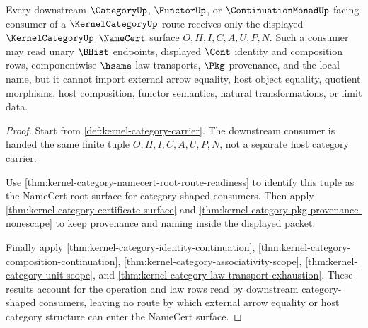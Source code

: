 \begin{theorem}
\label{thm:kernel-category-downstream-namecert-readiness}
Every downstream $\CategoryUp$, $\FunctorUp$, or $\ContinuationMonadUp$-facing consumer of a $\KernelCategoryUp$ route receives only the displayed $\KernelCategoryUp$ $\NameCert$ surface $O,H,I,C,A,U,P,N$. Such a consumer may read unary $\BHist$ endpoints, displayed $\Cont$ identity and composition rows, componentwise $\hsame$ law transports, $\Pkg$ provenance, and the local name, but it cannot import external arrow equality, host object equality, quotient morphisms, host composition, functor semantics, natural transformations, or limit data.
\end{theorem}
\begin{proof}
Start from \autoref{def:kernel-category-carrier}. The downstream consumer is handed the same finite tuple $O,H,I,C,A,U,P,N$, not a separate host category carrier.

Use \autoref{thm:kernel-category-namecert-root-route-readiness} to identify this tuple as the NameCert root surface for category-shaped consumers. Then apply \autoref{thm:kernel-category-certificate-surface} and \autoref{thm:kernel-category-pkg-provenance-nonescape} to keep provenance and naming inside the displayed packet.

Finally apply \autoref{thm:kernel-category-identity-continuation}, \autoref{thm:kernel-category-composition-continuation}, \autoref{thm:kernel-category-associativity-scope}, \autoref{thm:kernel-category-unit-scope}, and \autoref{thm:kernel-category-law-transport-exhaustion}. These results account for the operation and law rows read by downstream category-shaped consumers, leaving no route by which external arrow equality or host category structure can enter the NameCert surface.
\end{proof}

